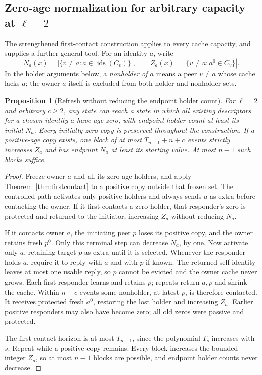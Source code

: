 \documentclass[11pt]{article}
\newtheorem{proposition}[theorem]{Proposition}
\begin{document}
\subsection{Zero-age normalization for arbitrary capacity at $\ell=2$}

The strengthened first-contact construction applies to every
cache capacity, and supplies a further general tool.
For an identity $a$, write
\[
 N_a(x)=|\{v\ne a:a\in\operatorname{ids}(C_v)\}|,
 \qquad Z_a(x)=|\{v\ne a:a^0\in C_v\}|.
\]
In the holder arguments below, a \emph{nonholder of $a$}
means a peer $v\ne a$ whose cache lacks $a$; the owner
$a$ itself is excluded from both holder and nonholder sets.

\begin{proposition}[Refresh without reducing the endpoint holder count]
\label{prop:zeroify}
For $\ell=2$ and arbitrary $c\ge2$, any state can reach
a state in which all existing descriptors for a chosen
identity $a$ have age zero, with endpoint holder count
at least its initial $N_a$. Every initially zero copy
is preserved throughout the construction.
If a positive-age copy exists, one block of at most
$T_{n-1}+n+c$ events strictly increases $Z_a$ and has
endpoint $N_a$ at least its starting value. At most
$n-1$ such blocks suffice.
\end{proposition}
\begin{proof}
Freeze owner $a$ and all its zero-age holders, and apply
Theorem~\ref{thm:firstcontact} to a positive copy outside
that frozen set. The controlled path activates only
positive holders and always sends $a$ as extra before
contacting the owner. If it first contacts a zero holder,
that responder's zero is protected and returned to the
initiator, increasing $Z_a$ without reducing $N_a$.

If it contacts owner $a$, the initiating peer $p$ loses
its positive copy, and the owner retains fresh $p^0$.
Only this terminal step can decrease $N_a$, by one.
Now activate only $a$, retaining target $p$ as extra
until it is selected. Whenever the responder holds $a$,
require it to reply with $a$ and with $p$ if known.
The returned self identity leaves at most one usable
reply, so $p$ cannot be evicted and the owner cache
never grows. Each first responder learns and retains
$p$; repeats return $a,p$ and shrink the cache.
Within $n+c$ events some nonholder, at latest $p$, is
therefore contacted. It receives protected fresh $a^0$,
restoring the lost holder and increasing $Z_a$.
Earlier positive responders may also have become zero;
all old zeros were passive and protected.

The first-contact horizon is at most $T_{n-1}$, since
the polynomial $T_s$ increases with $s$. Repeat while
a positive copy remains. Every block increases the
bounded integer $Z_a$, so at most $n-1$ blocks are
possible, and endpoint holder counts never decrease.
\end{proof}
\end{document}
